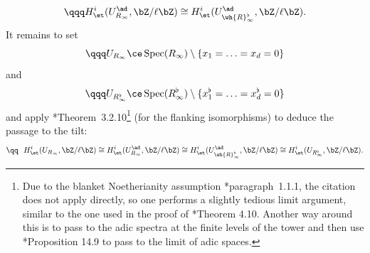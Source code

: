 \[
\qqq H^i_\et(U_{R_\infty}^\ad, \bZ/\ell\bZ) \cong H^i_\et(U_{\wh{R}_\infty^\flat}^\ad, \bZ/\ell\bZ). %
\]
It remains to set
\[
\qqq U_{R_\infty} \ce \Spec(R_\infty) \setminus \{ x_1 = \dotsc = x_d = 0\}
\]
and
\[
\qqq U_{R^\flat_\infty} \ce \Spec(R^\flat_\infty) \setminus \{ x^\flat_1 = \dotsc = x^\flat_d = 0\}
\]
and apply \cite{Hub96}*{Theorem~3.2.10}\footnote{Due to the blanket Noetherianity assumption  \cite{Hub96}*{paragraph~1.1.1}, the citation does not apply directly, so one performs a slightly tedious limit argument, similar to the one used in the proof of \cite{brauer-purity}*{Theorem 4.10}. Another way around this is to pass to the adic spectra at the finite levels of the tower and then use \cite{Sch17}*{Proposition 14.9} to pass to the limit of adic spaces.} (for the flanking isomorphisms) to deduce the passage to the tilt:
\[
\qq\ \ H^i_\et(U_{R_\infty}, \bZ/\ell\bZ) \cong  H^i_\et(U_{R_\infty}^\ad, \bZ/\ell\bZ) \cong H^i_\et(U_{\wh{R}_\infty^\flat}^\ad, \bZ/\ell\bZ) \cong H^i_\et(U_{R_\infty^\flat}, \bZ/\ell\bZ).
\]
\erems























 



